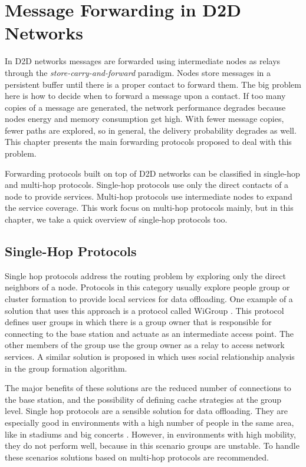 \chapter{Message Forwarding in D2D Networks}
\label{ch:MessageForwarding}

In D2D networks messages are forwarded using intermediate nodes as relays through the \textit{store-carry-and-forward} paradigm. Nodes store messages in a persistent buffer until there is a proper contact to forward them. The big problem here is how to decide when to forward a message upon a contact.
If too many copies of a message are generated, the network performance degrades because nodes energy and memory consumption get high. With fewer message copies, fewer paths are explored, so in general, the delivery probability degrades as well. This chapter presents the main forwarding
protocols proposed to deal with this problem.

Forwarding protocols built on top of D2D networks can be classified in single-hop and multi-hop protocols. Single-hop protocols use only the direct contacts of a node to provide services. Multi-hop protocols use intermediate nodes to expand the service coverage. This work focus on multi-hop protocols mainly, but in this chapter, we take a quick overview of single-hop protocols too.

\section{Single-Hop Protocols}

Single hop protocols address the routing problem by exploring only the direct neighbors of a node. Protocols in this category usually explore people group or cluster formation to provide local services for data offloading. One example of a solution that uses this approach is a protocol called WiGroup \citep{wang2015wigroup}. This protocol defines user groups in which there is a group owner that is responsible for connecting to the base station and actuate as an intermediate access point. The other members of the group use the group owner as a relay to access network services. A similar solution is proposed in \citep{zheng2014social} which uses social relationship analysis in the group formation algorithm.

The major benefits of these solutions are the reduced number of connections to the base station, and the possibility of defining cache strategies at the group level. Single hop protocols are a sensible solution for data offloading. They are especially good in environments with a high number of people in the same area, like in stadiums and big concerts \citep{wang2015wigroup}. However, in environments with high mobility, they do not perform well, because in this scenario groups are unstable.
To handle these scenarios solutions based on multi-hop protocols are recommended.

